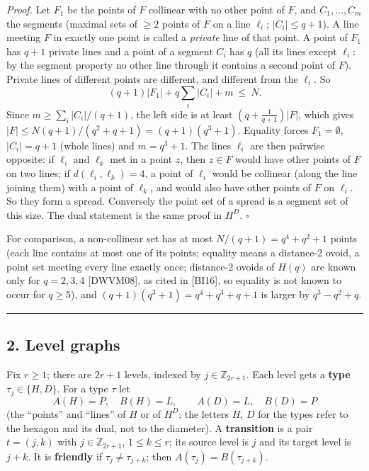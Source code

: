 \documentclass[
  11pt,
]{article}
\begin{document}
\emph{Proof.} Let \(F_1\) be the points of \(F\) collinear with no other point of \(F\), and \(C_1,\dots,C_m\) the
segments (maximal sets of \(\ge 2\) points of \(F\) on a line \(\ell_i\); \(\lvert C_i\rvert\le q+1\)). A line meeting
\(F\) in exactly one point is called a \emph{private} line of that point. A point of \(F_1\) has \(q+1\) private lines
and a point of a segment \(C_i\) has \(q\) (all its lines except \(\ell_i\): by the segment property no other line
through it contains a second point of \(F\)). Private lines of different points are different, and different from the
\(\ell_i\). So \[(q+1)\lvert F_1\rvert + q\sum_i \lvert C_i\rvert + m\ \le\ N .\] Since
\(m\ge \sum_i\lvert C_i\rvert/(q+1)\), the left side is at least \((q + \tfrac1{q+1})\lvert F\rvert\), which gives
\(\lvert F\rvert\le N(q+1)/(q^2+q+1) = (q+1)(q^3+1)\). Equality forces \(F_1 = \emptyset\), \(\lvert C_i\rvert = q+1\)
(whole lines) and \(m = q^3+1\). The lines \(\ell_i\) are then pairwise opposite: if \(\ell_i\) and \(\ell_k\) met in a
point \(z\), then \(z\in F\) would have other points of \(F\) on two lines; if \(d(\ell_i,\ell_k) = 4\), a point of
\(\ell_i\) would be collinear (along the line joining them) with a point of \(\ell_k\), and would also have other points
of \(F\) on \(\ell_i\). So they form a spread. Conversely the point set of a spread is a segment set of this size. The
dual statement is the same proof in \(H^D\). \(\square\)

For comparison, a non-collinear set has at most \(N/(q+1) = q^4+q^2+1\) points (each line contains at most one of its
points; equality means a distance-2 ovoid, a point set meeting every line exactly once; distance-2 ovoids of \(H(q)\)
are known only for \(q = 2, 3, 4\) {[}DWVM08{]}, as cited in {[}BI16{]}, so equality is not known to occur for
\(q\ge 5\)), and \((q+1)(q^3+1) = q^4+q^3+q+1\) is larger by \(q^3-q^2+q\).

\begin{center}\rule{0.5\linewidth}{0.5pt}\end{center}

\hypertarget{level-graphs}{%
\subsection{2. Level graphs}\label{level-graphs}}

Fix \(r\ge 1\); there are \(2r+1\) levels, indexed by \(j\in\mathbb Z_{2r+1}\). Each level gets a \textbf{type}
\(\tau_j\in\{H, D\}\). For a type \(\tau\) let \[A(H) = P,\quad B(H) = L,\qquad A(D) = L,\quad B(D) = P\] (the
``points'' and ``lines'' of \(H\) or of \(H^D\); the letters \(H\), \(D\) for the types refer to the hexagon and its
dual, not to the diameter). A \textbf{transition} is a pair \(t = (j,k)\) with \(j\in\mathbb Z_{2r+1}\),
\(1\le k\le r\); its source level is \(j\) and its target level is \(j+k\). It is \textbf{friendly} if
\(\tau_j\ne\tau_{j+k}\); then \(A(\tau_j) = B(\tau_{j+k})\).
\end{document}
